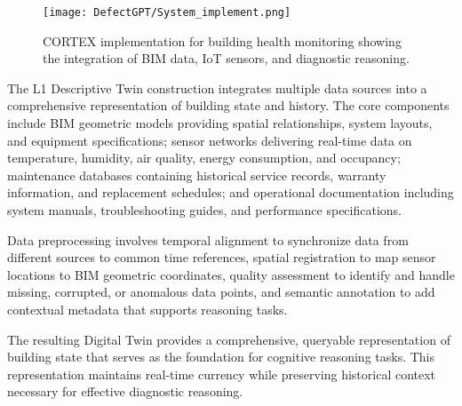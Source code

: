 \begin{figure}[htbp]
\centering
\texttt{[image: DefectGPT/System\_implement.png]}
\caption{CORTEX implementation for building health monitoring showing the integration of BIM data, IoT sensors, and diagnostic reasoning.}
\label{fig:system_implementation}
\end{figure}

The L1 Descriptive Twin construction integrates multiple data sources into a comprehensive representation of building state and history. The core components include BIM geometric models providing spatial relationships, system layouts, and equipment specifications; sensor networks delivering real-time data on temperature, humidity, air quality, energy consumption, and occupancy; maintenance databases containing historical service records, warranty information, and replacement schedules; and operational documentation including system manuals, troubleshooting guides, and performance specifications.

Data preprocessing involves temporal alignment to synchronize data from different sources to common time references, spatial registration to map sensor locations to BIM geometric coordinates, quality assessment to identify and handle missing, corrupted, or anomalous data points, and semantic annotation to add contextual metadata that supports reasoning tasks.

The resulting Digital Twin provides a comprehensive, queryable representation of building state that serves as the foundation for cognitive reasoning tasks. This representation maintains real-time currency while preserving historical context necessary for effective diagnostic reasoning.

